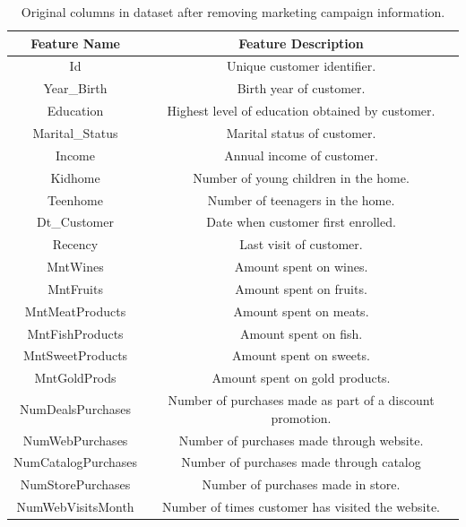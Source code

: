 \documentclass{article}
\begin{document}
\begin{multicols}{2}
\begin{table}
    \centering
        \begin{tabular}{|c|c|}
            \hline
            \textbf{Feature Name} & \textbf{Feature Description} \\
            \hline
            Id & Unique customer identifier. \\
            Year\_Birth & Birth year of customer. \\
            Education & Highest level of education obtained by customer. \\
            Marital\_Status & Marital status of customer. \\
            Income & Annual income of customer. \\
            Kidhome & Number of young children in the home. \\
            Teenhome & Number of teenagers in the home. \\
            Dt\_Customer & Date when customer first enrolled. \\
            Recency & Last visit of customer. \\
            MntWines & Amount spent on wines. \\
            MntFruits & Amount spent on fruits. \\
            MntMeatProducts & Amount spent on meats. \\
            MntFishProducts & Amount spent on fish. \\
            MntSweetProducts & Amount spent on sweets. \\
            MntGoldProds & Amount spent on gold products. \\
            NumDealsPurchases & Number of purchases made as part of a discount promotion. \\
            NumWebPurchases & Number of purchases made through website. \\
            NumCatalogPurchases & Number of purchases made through catalog \\
            NumStorePurchases & Number of purchases made in store. \\
            NumWebVisitsMonth & Number of times customer has visited the website. \\
            \hline
        \end{tabular}%
    \caption{Original columns in dataset after removing marketing campaign information.}
\end{table}


\end{multicols}
\end{document}
